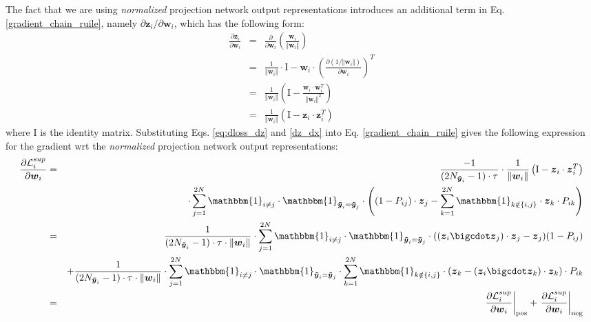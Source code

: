The fact that we are using \emph{normalized} projection network output representations introduces an additional term in Eq. \ref{gradient_chain_ruile}, namely $\partial\boldsymbol{z}_i/\partial\boldsymbol{w}_i$, which has the following form:
\begin{eqnarray}
  \frac{\partial\boldsymbol{z}_i}{\partial\boldsymbol{w}_i} & = & \frac{\partial}{\partial\boldsymbol{w}_i}\left(\frac{\boldsymbol{w}_i}{\Vert\boldsymbol{w}_i\Vert}\right) \nonumber \\
  & = & \frac{1}{\Vert\boldsymbol{w}_i\Vert}\cdot\text{I}-\boldsymbol{w}_i\cdot\left(\frac{\partial\left(1/\Vert\boldsymbol{w}_i\Vert\right)}{\partial\boldsymbol{w}_i}\right)^T \nonumber \\
  & = & \frac{1}{\Vert\boldsymbol{w}_i\Vert}\left(\text{I}-\frac{\boldsymbol{w}_i\cdot\boldsymbol{w}_i^T}{\Vert\boldsymbol{w}_i\Vert^2}\right) \nonumber \\
  & = & \frac{1}{\Vert\boldsymbol{w}_i\Vert}\left(\text{I}-\boldsymbol{z}_i\cdot\boldsymbol{z}_i^T\right) \label{dz_dx}
\end{eqnarray}
where I is the identity matrix. Substituting Eqs. \ref{eq:dloss_dz} and \ref{dz_dx} into Eq. \ref{gradient_chain_ruile} gives the following expression for the gradient wrt the \emph{normalized} projection network output representations:
\begin{eqnarray}
  \frac{\partial\mathcal{L}_i^{sup}}{\partial\boldsymbol{w}_i} & = & \frac{-1}{(2N_{\boldsymbol{\tilde{y}}_i}-1)\cdot\tau}\cdot\frac{1}{\Vert\boldsymbol{w}_i\Vert}\left(\text{I}-\boldsymbol{z}_i\cdot\boldsymbol{z}_i^T\right)\nonumber\\
  & & \cdot\sum_{j=1}^{2N}\mathbbm{1}_{i\neq j}\cdot\mathbbm{1}_{\boldsymbol{\tilde{y}}_i=\boldsymbol{\tilde{y}}_j}\cdot
  \left(
    (1-P_{ij})\cdot\boldsymbol{z}_j-\sum_{k=1}^{2N}\mathbbm{1}_{k\notin\{i,j\}}\cdot\boldsymbol{z}_k\cdot P_{ik}
  \right) \nonumber \\
  & = & \frac{1}{(2N_{\boldsymbol{\tilde{y}}_i}-1)\cdot\tau\cdot\Vert\boldsymbol{w}_i\Vert}\cdot\sum_{j=1}^{2N}\mathbbm{1}_{i\neq j}\cdot\mathbbm{1}_{\boldsymbol{\tilde{y}}_i=\boldsymbol{\tilde{y}}_j}\cdot
  ((\boldsymbol{z}_i\bigcdot\boldsymbol{z}_j)\cdot\boldsymbol{z}_j-\boldsymbol{z}_j)(1-P_{ij}) \nonumber \\
  & & + \frac{1}{(2N_{\boldsymbol{\tilde{y}}_i}-1)\cdot\tau\cdot\Vert\boldsymbol{w}_i\Vert}\cdot\sum_{j=1}^{2N}\mathbbm{1}_{i\neq j}\cdot\mathbbm{1}_{\boldsymbol{\tilde{y}}_i=\boldsymbol{\tilde{y}}_j}\cdot
  \sum_{k=1}^{2N}\mathbbm{1}_{k\notin\{i,j\}}\cdot(\boldsymbol{z}_k-(\boldsymbol{z}_i\bigcdot\boldsymbol{z}_k)\cdot\boldsymbol{z}_k)\cdot P_{ik} \nonumber \\
  & = & \left.\frac{\partial\mathcal{L}_i^{sup}}{\partial\boldsymbol{w}_i}\right\vert_\text{pos}+\left.\frac{\partial\mathcal{L}_i^{sup}}{\partial\boldsymbol{w}_i}\right\vert_\text{neg} \nonumber
\end{eqnarray}
